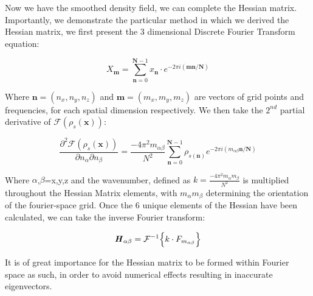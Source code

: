 \documentclass[a4paper,fleqn,usenatbib]{mnras}
\begin{document}
\\
\\
Now we have the smoothed density field, we can complete the Hessian matrix. Importantly, we demonstrate the particular method in which we derived the Hessian matrix, we  first present the 3 dimensional Discrete Fourier Transform equation:
\begin{ceqn}
\begin{equation}
X_{\textbf{m}}=\sum_{\textbf{n}=0}^{\textbf{N}-1}x_{\textbf{n}}\cdot e^{-2\pi i(\textbf{mn}/\textbf{N})}
\label{dft}
\end{equation}
\end{ceqn}
Where $\textbf{n}=(n_{x},n_{y},n_{z})$ and $\textbf{m}=(m_{x},m_{y},m_{z})$ are vectors of grid points and frequencies, for each spatial dimension respectively. We then take the $2^{nd}$ partial derivative of  $\mathcal{F}(\rho_{s}(\textbf{x}))$:

\begin{ceqn}
\begin{equation}
\frac{\partial^{2} \mathcal{F}(\rho_{s}(\textbf{x}))}{\partial n_{\alpha} \partial n_{\beta}}=\frac{-4\pi^{2}m_{\alpha \beta}}{N^{2}}\sum_{\textbf{n}=0}^{\textbf{N}-1}\rho_{s(\textbf{n})}e^{-2\pi i(m_{\alpha \beta}\textbf{n}/\textbf{N})} 
\label{dftdiff}
\end{equation}
\end{ceqn}

Where $\alpha$,$\beta$=x,y,z and the wavenumber, defined as $k=\frac{-4\pi^{2}m_{\alpha}m_{\beta}}{N^{2}}$ is multiplied throughout the Hessian Matrix elements, with $m_{\alpha}m_{\beta}$ determining the orientation of the fourier-space grid. Once the 6 unique elements of the Hessian have been calculated, we can take the inverse Fourier transform:
\begin{ceqn}
\begin{equation}
\textbf{\textit{H}}_{\alpha \beta}=\mathcal{F}^{-1}\Big\{k\cdot F_{m_{\alpha \beta}}\Big\}
\label{invfouriordtf}
\end{equation}
\end{ceqn}
It is of great importance for the Hessian matrix to be formed within Fourier space as such, in order to avoid numerical effects resulting in inaccurate eigenvectors.
\end{document}
